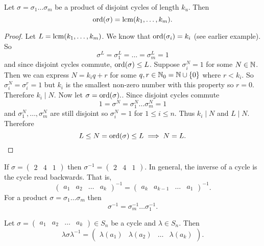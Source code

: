 \begin{lemma}
    Let $\sigma = \sigma_1 \ldots \sigma_m$
    be a product of disjoint cycles of length $k_u$.
    Then 
    \[
        \operatorname{ord}(\sigma) = \operatorname{lcm}(k_1, \ldots, k_m).
    \]
\end{lemma}

\begin{proof}
    Let $L = \operatorname{lcm}(k_1, \ldots, k_m)$.
    We know that $\operatorname{ord}(\sigma_i) = k_i$ (see earlier example).
    So 
    \[
        \sigma^L = \sigma_1^L = \ldots = \sigma_m^L = 1
    \]
    and since disjoint cycles commute, $\operatorname{ord}(\sigma) \leq L$.
    Suppose $\sigma_i^N = 1$ for some $N \in \mathbb{N}$.
    Then we can express 
    $N = k_i q + r$
    for some $q, r \in \mathbb{N}_0 = \mathbb{N} \cup \{0\}$ where
    $r < k_i$.
    So $\sigma_i^N = \sigma_i^r = 1$
    but $k_i$ is the smallest non-zero number with
    this property so $r = 0$.
    Therefore $k_i \mid N$.
    Now let $\sigma = \operatorname{ord}(\sigma).$.
    Since disjoint cycles commute
    \[
        1 = \sigma^N = \sigma_1^N \ldots \sigma_m^N = 1
    \]
    and $\sigma_1^N, \ldots, \sigma_m^N$ are still disjoint
    so $\sigma_i^N = 1$ for $1 \leq i \leq n$.
    Thus $k_i \mid N$ and $L \mid N$.
    Therefore
    \[
        L \leq N = \operatorname{ord}(\sigma) \leq L \implies N = L.
    \]
\end{proof}

\begin{example}[Inverses]
    If
    $
        \sigma =
        \begin{pmatrix}
            2 & 4 & 1
        \end{pmatrix}
    $
    then
    $
        \sigma^{-1} =
        \begin{pmatrix}
            2 & 4 & 1
        \end{pmatrix}
    $.
    In general, the inverse of a cycle is the cycle read backwards.
    That is,
    \[
        \begin{pmatrix}
            a_1 & a_2 & \ldots & a_k
        \end{pmatrix}
        ^{-1}
        =
        \begin{pmatrix}
            a_k & a_{k-1} & \ldots & a_1
        \end{pmatrix}
        ^{-1}.
    \]
    For a product $\sigma = \sigma_1 \ldots \sigma_m$ then
    \[
        \sigma^{-1} = \sigma_m^{-1} \ldots \sigma_1^{-1}.
    \]
\end{example}

\begin{lemma}
    Let
    $
        \sigma =
        \begin{pmatrix}
            a_1 & a_2 & \ldots & a_k
        \end{pmatrix}
        \in S_n
    $
    be a cycle and $\lambda \in S_n$.
    Then
    \[
        \lambda \sigma \lambda^{-1}
        = 
        \begin{pmatrix}
            \lambda(a_1) & \lambda(a_2) & \ldots & \lambda(a_k)
        \end{pmatrix}
        .
    \]
\end{lemma}

